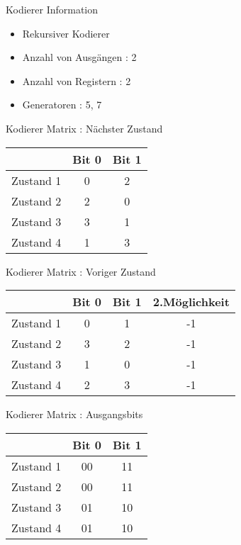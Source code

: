 \begin{frame}{Kodierer Information}

\begin{itemize}
\tightlist
\item
  Rekursiver Kodierer
\item
  Anzahl von Ausgängen : 2
\item
  Anzahl von Registern : 2
\item
  Generatoren : 5, 7
\end{itemize}

\end{frame}

\begin{frame}{Kodierer Matrix : Nächster Zustand}

\begin{longtable}[c]{@{}lcc@{}}
\toprule
& Bit 0 & Bit 1\tabularnewline
\midrule
\endhead
Zustand 1 & 0 & 2\tabularnewline
Zustand 2 & 2 & 0\tabularnewline
Zustand 3 & 3 & 1\tabularnewline
Zustand 4 & 1 & 3\tabularnewline
\bottomrule
\end{longtable}

\end{frame}

\begin{frame}{Kodierer Matrix : Voriger Zustand}

\begin{longtable}[c]{@{}lccc@{}}
\toprule
& Bit 0 & Bit 1 & 2.Möglichkeit\tabularnewline
\midrule
\endhead
Zustand 1 & 0 & 1 & -1\tabularnewline
Zustand 2 & 3 & 2 & -1\tabularnewline
Zustand 3 & 1 & 0 & -1\tabularnewline
Zustand 4 & 2 & 3 & -1\tabularnewline
\bottomrule
\end{longtable}

\end{frame}

\begin{frame}{Kodierer Matrix : Ausgangsbits}

\begin{longtable}[c]{@{}lcc@{}}
\toprule
& Bit 0 & Bit 1\tabularnewline
\midrule
\endhead
Zustand 1 & 00 & 11\tabularnewline
Zustand 2 & 00 & 11\tabularnewline
Zustand 3 & 01 & 10\tabularnewline
Zustand 4 & 01 & 10\tabularnewline
\bottomrule
\end{longtable}

\end{frame}

